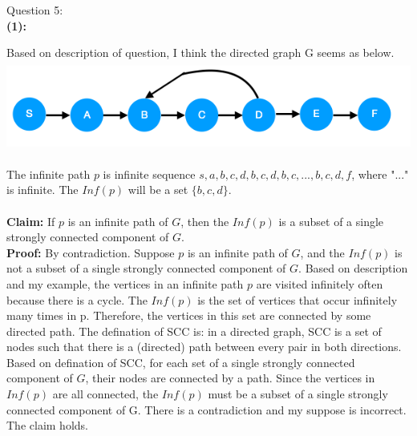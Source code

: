 \documentclass[12pt]{article}
\begin{document}
\pagebreak
\noindent
\large Question 5: \\
\normalsize 
\setlength{\baselineskip}{8mm}
\noindent
\textbf{(1):} \par
Based on description of question, I think the directed graph G seems as below. \\
\includegraphics[width=14cm, height=3cm]{question5image} \par
The infinite path $p$ is infinite sequence $s, a, b, c, d, b, c ,d, b, c, ..., b, c, d, f$, where "..." is infinite. 
The $Inf(p)$ will be a set $\{b, c, d\}$. \\
\\
\textbf{Claim: } If $p$ is an infinite path of $G$, then the $Inf(p)$ is a subset of a single strongly connected component of $G$. \\
\textbf{Proof: } By contradiction. Suppose $p$ is an infinite path of $G$, and the $Inf(p)$ is not a subset of a single strongly connected component of $G$. 
Based on description and my example, the vertices in an infinite path $p$ are visited infinitely often because there is a cycle. 
The $Inf(p)$ is the set of vertices that occur infinitely many times in p. Therefore, the vertices in this set are connected by some directed path.
The defination of SCC is: in a directed graph, SCC is a set of nodes such that there is a (directed) path between every pair in both directions.
Based on defination of SCC, for each set of a single strongly connected component of $G$, their nodes are connected by a path. 
Since the vertices in $Inf(p)$ are all connected, the $Inf(p)$ must be a subset of a single strongly connected component of G. 
There is a contradiction and my suppose is incorrect. The claim holds.
\end{document}
